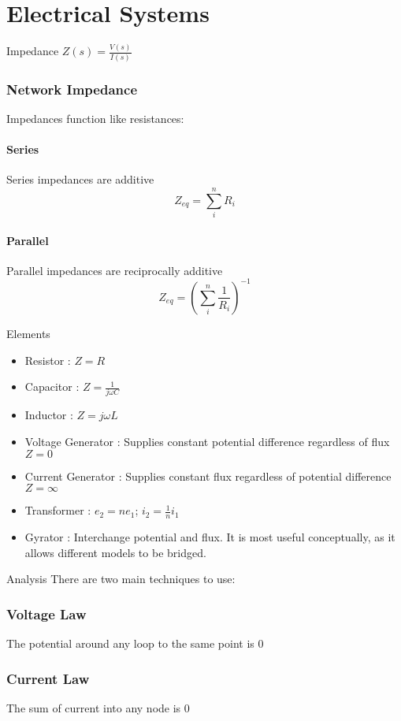 \documentclass{../templates/topic}
\begin{document}
\chapter{Electrical Systems}

\begin{section}{Impedance}
	 $Z(s)=\frac{V(s)}{I(s)}$
	
	\subsection{Network Impedance}
	Impedances function like resistances:
	\subsubsection*{Series}
	Series impedances are additive
	\begin{equation}
		Z_{eq} = \sum_{i}^{n}{R_i}
	\end{equation}
	\subsubsection*{Parallel}
	Parallel impedances are reciprocally additive
	\begin{equation}
		Z_{eq} = (\sum_{i}^{n}{\frac{1}{R_i}})^{-1}
	\end{equation}
\end{section}

\begin{section}{Elements}
	\begin{itemize}
		\item Resistor : $Z=R$
		\item Capacitor : $Z=\frac{1}{j\omega C}$
		\item Inductor : $Z=j\omega L$
		\item Voltage Generator : Supplies constant potential difference regardless of flux $Z=0$
		\item Current Generator : Supplies constant flux regardless of potential difference $Z=\infty$
		\item Transformer : $e_2 = ne_1$; $i_2 = \frac{1}{n}i_1$
		\item Gyrator : Interchange potential and flux. It is most useful conceptually, as it allows different models to be bridged.
	\end{itemize}
\end{section}


\begin{section}{Analysis}
	There are two main techniques to use:
	\subsection{Voltage Law}
		The potential around any loop to the same point is 0
	\subsection{Current Law}
		The sum of current into any node is 0
\end{section}
\end{document}
